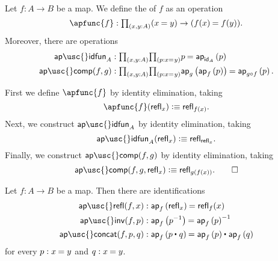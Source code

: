 \begin{defn}\label{defn:ap}
Let $f:A\to B$ be a map. We define the  of $f$ as an operation
\begin{equation*}
\apfunc{f} : \prd*{x,y:A} (\id{x}{y})\to(\id{f(x)}{f(y)}).
\end{equation*}
Moreover, there are operations
\begin{align*}
\mathsf{ap\usc{}idfun}_A & : \prd*{x,y:A}{p:\id{x}{y}} \id{p}{\ap{\idfunc[A]}{p}} \\
\mathsf{ap\usc{}comp}(f,g) & : \prd*{x,y:A}{p:\id{x}{y}} \id{\ap{g}{\ap{f}{p}}}{\ap{g\circ f}{p}}.
\end{align*}
\end{defn}

\begin{constr}
First we define $\apfunc{f}$ by identity elimination, taking
\begin{equation*}
\apfunc{f}(\refl{x})\defeq \refl{f(x)}.
\end{equation*}
Next, we construct $\mathsf{ap\usc{}idfun}_A$ by identity elimination, taking
\begin{equation*}
\mathsf{ap\usc{}idfun}_A(\refl{x}) \defeq \refl{\refl{x}}.
\end{equation*}
Finally, we construct $\mathsf{ap\usc{}comp}(f,g)$ by identity elimination, taking
\begin{equation*}
\mathsf{ap\usc{}comp}(f,g,\refl{x}) \defeq \refl{g(f(x))}.\qedhere
\end{equation*}
\end{constr}

\begin{defn}\label{defn:ap-preserve}
Let $f:A\to B$ be a map. Then there are identifications
\begin{align*}
\mathsf{ap\usc{}refl}(f,x) & : \id{\ap{f}{\refl{x}}}{\refl{f}(x)} \\
\mathsf{ap\usc{}inv}(f,p) & : \id{\ap{f}{p^{-1}}}{\ap{f}{p}^{-1}} \\
\mathsf{ap\usc{}concat}(f,p,q) & : \id{\ap{f}{\ct{p}{q}}}{\ct{\ap{f}{p}}{\ap{f}{q}}}
\end{align*}
for every $p:\id{x}{y}$ and $q:\id{x}{y}$.
\end{defn}

